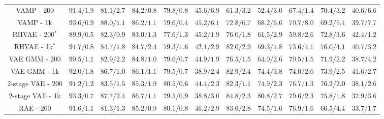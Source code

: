\documentclass[10pt,journal,compsoc]{IEEEtran}
\begin{document}
\begin{table*}[!t]
\begin{tabular}{c|ccccc|ccccc}
     VAMP - 200         & $ 91.4 /1.9 $  & $ 81.1 /2.7 $ & $ 84.2 /0.8 $ & $ 79.8 /0.8 $& 
     $45.6 /6.9$
     & $ 61.3 /3.2 $ & $ 52.4 /3.0 $ & $ 67.4 /1.4 $ & $ 70.4 /3.2 $ &$40.6 /6.6 $ \\
     VAMP - 1k          & $ \boldsymbol{93.6 /0.9} $  & $ 88.0 /1.1 $ & $ 86.2 /1.1 $ & $ 79.6 /0.4 $ & 
     $45.2 /6.1$
     &$ 72.8 /6.7 $ & $ 68.2 /6.6 $ & $ 70.7 /8.0 $ & $ 69.2 /5.4 $ & $39.7 /7.7$\\
     RHVAE - 200$^*$ & $ 89.9 /0.5$ & $82.3 /0.9$ & $83.0 /1.3$ & $77.6/1.3$&
     $45.2 /1.9$
     & $76.0 /1.8$ & $61.5 /2.9$ & $59.8 /2.6$ & $72.8 /3.6$ & $42.4 /1.2$ \\
     RHVAE - 1k$^*$  & $ 91.7 /0.8$ & $84.7 /1.8$ & $84.7 /2.4$ & $79.3/1.6$ & 
     $42.1 /2.9$
     &$82.0 /2.9$ & $69.3 /1.8$ & $73.6 /4.1$ & $76.0 /4.1$ & $ 40.7 /3.2$\\
     \hline
     VAE GMM - 200 & $ 90.5 /1.1 $  & $ 82.9 /2.2 $ & $ 84.8 /1.0 $ & $ 79.6 /0.7 $ & 
     $44.9 /1.9$
     &$76.5 /1.5$ & $ 64.0 /2.6 $ & $ 70.5 /1.5 $ & $ 71.9 /2.2 $ &$38.7 /4.2$ \\
     VAE GMM - 1k & $ 92.0 /1.8 $  & $ 86.7 /1.0 $ & $ 86.1 /1.1 $ & $ 79.5 /0.7 $  & 
     $38.9 /2.4$
     &$82.9 /2.4$ & $ 74.4 /3.8 $ & $ 74.0 /2.6 $ & $ 73.9 /2.5 $ & $41.6 /2.7$\\
     2-stage VAE - 200 & $ 91.2 /1.2 $  & $ 83.5 /1.5 $ & $ 85.3 /1.9 $ & $ \boldsymbol{80.5 /0.6}$ & 
     $44.4 /2.3$
     &$ 82.3 /1.1 $ & $ 74.9 /2.3 $ & $ 76.7 /1.3 $ & $ 76.2 /2.0 $ & $38.1 /2.6$\\
     2-stage VAE - 1k & $ 93.3 /0.7 $  & $ 87.7 /2.4 $ & $ 86.7 /1.1 $& $ 79.5 /0.9 $  & 
     $38.8 /3.0$
     &$ 84.8 /2.3 $ & $ 80.8 /2.7 $ & $ 79.6 /2.3 $ & $ 75.8 /1.8 $ & $37.9 /3.6$\\
     RAE - 200     & $ 91.6 /1.1 $  & $ 81.3 /1.3 $ & $ 85.2 /0.9 $& $ 80.1 /0.8 $ & 
     $46.2 /2.9$
     &$ 83.6 /2.8 $  & $ 74.5 /1.6 $ & $ 76.9 /1.6 $& $ 66.5 /4.4 $ & $33.7 /1.7 $\\

\end{tabular}
\end{table*}
\end{document}
